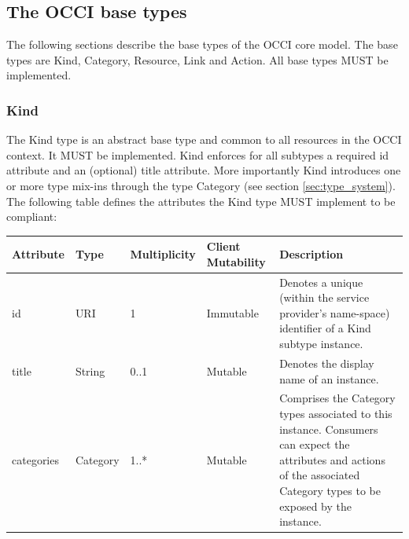 \documentclass[10pt,a4paper,british]{article}
\newcommand{\hl}{\texttt}
\begin{document}

\subsection{The OCCI base types}
\label{sec:base_types}
The following sections describe the base types of the OCCI core
model. The base types are Kind, Category, Resource, Link and
Action. All base types MUST be implemented.

\subsubsection{Kind}
The Kind type is an abstract base type and common to all resources in
the OCCI context. It MUST be implemented. Kind enforces for all
subtypes a required id attribute and an (optional) title
attribute. More importantly Kind introduces one or more type mix-ins
through the type Category (see section \ref{sec:type_system}). The
following table defines the attributes the Kind type MUST implement to
be compliant:

\begin{tabular}{l|l|l|l|p{2.7in}}
Attribute & Type & Multiplicity & Client Mutability & Description \\
\hline
id & URI & 1 & Immutable & Denotes a unique (within the service provider's name-space) identifier of a Kind subtype instance. \\
title & String & 0..1 & Mutable & Denotes the display name of an instance. \\
categories & Category & 1..* & Mutable\footnotemark[1] & Comprises the Category types associated to this instance. Consumers can expect the attributes and actions of the associated Category types to be exposed by the instance. \\ 
\end{tabular}
\addtocounter{footnote}{1}
\end{document}
